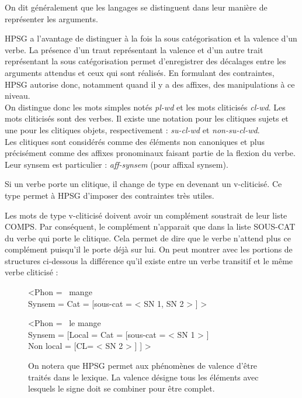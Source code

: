 On dit généralement que les langages se distinguent dans leur manière de représenter les arguments.

HPSG a l'avantage de distinguer à la fois la sous catégorisation et la valence d'un verbe.
La présence d'un traut représentant la valence et d'un autre trait représentant la sous catégorisation permet d'enregistrer des décalages entre les arguments attendus et ceux qui sont réalisés.
En formulant des contraintes, HPSG autorise donc, notamment quand il y a des affixes, des manipulations à ce niveau.\\

On distingue donc les mots simples notés \emph{pl-wd} et les mots cliticisés \emph{cl-wd}.
Les mots cliticisés sont des verbes.
Il existe une notation pour les clitiques sujets et une pour les clitiques objets, respectivement : \emph{su-cl-wd} et \emph{non-su-cl-wd}.\\

Les clitiques sont considérés comme des éléments non canoniques et plus précisément comme des affixes pronominaux faisant partie de la flexion du verbe.
Leur synsem est particulier : \emph{aff-synsem} (pour affixal synsem).

Si un verbe porte un clitique, il change de type en devenant un v-cliticisé.
Ce type permet à HPSG d'imposer des contraintes très utiles.

Les mots de type v-cliticisé doivent avoir un complément soustrait de leur liste COMPS.
Par conséquent, le complément n'apparait que dans la liste SOUS-CAT du verbe qui porte le clitique.
Cela permet de dire que le verbe n'attend plus ce complément puisqu'il le porte déjà sur lui.
On peut montrer avec les portions de structures ci-dessous la différence qu'il existe entre un verbe transitif et le même verbe cliticisé :\\

\begin{figure}[ht]
\begin{avm}

			<Phon = \ mange \ \\
			Synsem = Cat = [sous-cat = < SN {1}, SN {2} > ] >
\end{avm}
\end{figure}
\begin{figure}[ht]
\begin{avm}
			<Phon = \ le mange \ \\
			Synsem = [Local = Cat = [sous-cat = < SN {1} > ] \\
					  Non local = [CL= < SN {2} > ] ] >

\end{avm}
\caption{On notera que HPSG permet aux phénomènes de valence d'être traités dans le lexique.
La valence désigne tous les éléments avec lesquels le signe doit se combiner pour être complet.}
\end{figure}

